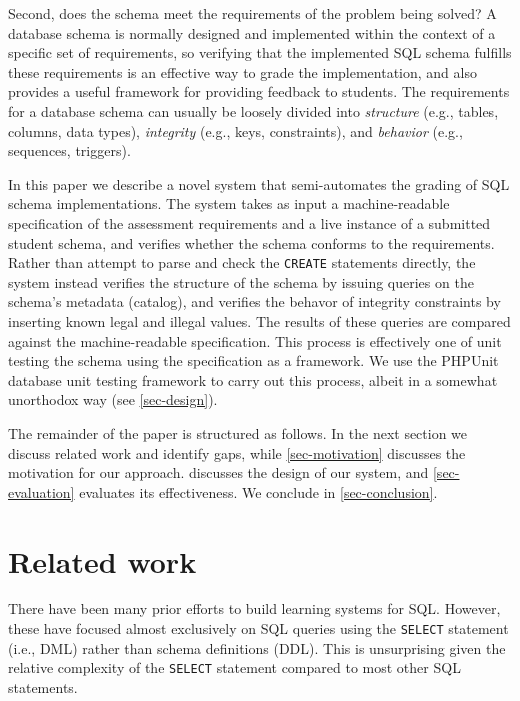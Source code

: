 \documentclass[sigconf, authordraft, capitalise]{acmart}
\begin{document}
Second, does the schema meet the requirements of the problem being solved? A database schema is normally designed and implemented within the context of a specific set of requirements, so verifying that the implemented SQL schema fulfills these requirements is an effective way to grade the implementation, and also provides a useful framework for providing feedback to students. The requirements for a database schema can usually be loosely divided into \emph{structure} (e.g., tables, columns, data types), \emph{integrity} (e.g., keys, constraints), and \emph{behavior} (e.g., sequences, triggers).

In this paper we describe a novel system that semi-automates the grading of SQL schema implementations. The system takes as input a machine-readable specification of the assessment requirements and a live instance of a submitted student schema, and verifies whether the schema conforms to the requirements. Rather than attempt to parse and check the \texttt{CREATE} statements directly, the system instead verifies the structure of the schema by issuing queries on the schema's metadata (catalog), and verifies the behavor of integrity constraints by inserting known legal and illegal values. The results of these queries are compared against the machine-readable specification. This process is effectively one of unit testing the schema using the specification as a framework. We use the PHPUnit database unit testing framework to carry out this process, albeit in a somewhat unorthodox way (see \cref{sec-design}).

The remainder of the paper is structured as follows. In the next section we discuss related work and identify gaps, while \cref{sec-motivation} discusses the motivation for our approach.  discusses the design of our system, and \cref{sec-evaluation} evaluates its effectiveness. We conclude in \cref{sec-conclusion}.


\section{Related work}
\label{sec-literature}

There have been many prior efforts to build learning systems for SQL. However, these have focused almost exclusively on SQL queries using the \texttt{SELECT} statement (i.e., DML) rather than schema definitions (DDL). This is unsurprising given the relative complexity of the \texttt{SELECT} statement compared to most other SQL statements.
\end{document}
